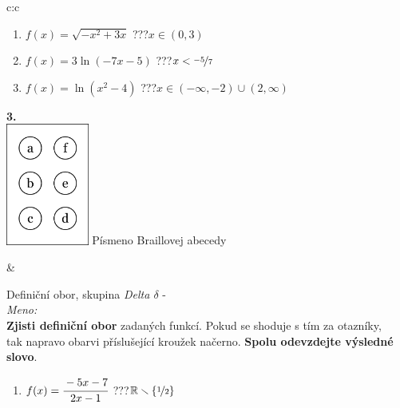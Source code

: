 \documentclass[10pt]{report}
\begin{document}
\begin{tabular}{c:c}
\begin{minipage}[c][99mm][t]{0.49\linewidth}
\begin{center}
\begin{minipage}{0.77\linewidth}
\begin{center}
\begin{varwidth}{\textwidth}
\begin{enumerate}
\item $f(x)=\sqrt{-x^2+3x}$\quad \dotfill\; ???\;\dotfill \quad $x\in(0 , 3)$
\item $f(x)=3\ln{(-7x-5)}$\quad \dotfill\; ???\;\dotfill \quad $x<\nicefrac{-5}{7}$
\item $f(x)=\ln{(x^2-4)}$\quad \dotfill\; ???\;\dotfill \quad $x\in(-\infty , -2)\cup(2 , \infty)$
\end{enumerate}
\end{varwidth}
\end{center}
\end{minipage}
\begin{minipage}{0.20\linewidth}
\begin{center}
{\Huge\bfseries 3.} \\[2mm]
\includegraphics[height=40mm]{../images/braille.png}
{\small Písmeno Braillovej abecedy}
\end{center}
\end{minipage}
\end{center}
\end{minipage}
&
\begin{minipage}[c][99mm][t]{0.49\linewidth}
\begin{center}
\vspace{7mm}
{\huge Definiční obor, skupina \textit{Delta $\delta$} -}\\[4.5mm]
\textit{Meno:}\phantom{xxxxxxxxxxxxxxxxxxxxxxxxxxxxxxxxxxxxxxxxxxxxxxxxxxxxxxxxxxxxxxxxx}\\[3.5mm]
\textbf{Zjisti definiční obor} zadaných funkcí. Pokud se shoduje s tím za otazníky,\\tak napravo obarvi příslušející kroužek načerno. \textbf{Spolu odevzdejte výsledné slovo}.\\[3mm]
\begin{minipage}{0.77\linewidth}
\begin{center}
\begin{varwidth}{\textwidth}
\begin{enumerate}
\normalsize
\item $f(x)=\cfrac{-5x-7}{2x-1}$\quad \dotfill\; ???\;\dotfill \quad $\mathbb{R}\smallsetminus\{\nicefrac{1}{2}\}$

\end{enumerate}
\end{varwidth}
\end{center}
\end{minipage}
\end{center}
\end{minipage}
\end{tabular}
\end{document}
